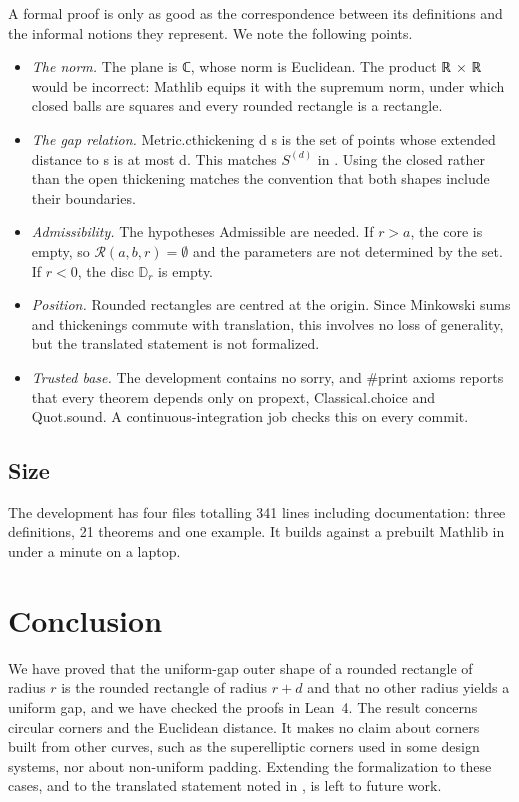 \documentclass[a4paper,UKenglish,cleveref,autoref,thm-restate]{lipics-v2021}
\newcommand{\Disc}{\mathbb{D}}
\newcommand{\RR}{\mathcal{R}}
\newcommand{\lean}[1]{{\leanfont #1}}
\begin{document}
A formal proof is only as good as the correspondence between its definitions and the informal
notions they represent. We note the following points.

\begin{itemize}
  \item \emph{The norm.} The plane is \lean{ℂ}, whose norm is Euclidean. The product
        \lean{ℝ × ℝ} would be incorrect: Mathlib equips it with the supremum norm, under which
        closed balls are squares and every rounded rectangle is a rectangle.
  \item \emph{The gap relation.} \lean{Metric.cthickening d s} is the set of points whose
        extended distance to \lean{s} is at most \lean{d}. This matches $S^{(d)}$ in
        . Using the closed rather than the open thickening matches the convention
        that both shapes include their boundaries.
  \item \emph{Admissibility.} The hypotheses \lean{Admissible} are needed. If $r > a$, the core
        is empty, so $\RR(a, b, r) = \emptyset$ and the parameters are not determined by the
        set. If $r < 0$, the disc $\Disc_r$ is empty.
  \item \emph{Position.} Rounded rectangles are centred at the origin. Since Minkowski sums and
        thickenings commute with translation, this involves no loss of generality, but the
        translated statement is not formalized.
  \item \emph{Trusted base.} The development contains no \lean{sorry}, and
        \lean{\#print axioms} reports that every theorem depends only on \lean{propext},
        \lean{Classical.choice} and \lean{Quot.sound}. A continuous-integration job checks this
        on every commit.
\end{itemize}

\subsection{Size}

The development has four files totalling 341 lines including documentation: three definitions,
21 theorems and one example. It builds against a prebuilt Mathlib in under a minute on a laptop.

\section{Conclusion}\label{sec:conclusion}

We have proved that the uniform-gap outer shape of a rounded rectangle of radius $r$ is the
rounded rectangle of radius $r + d$ and that no other radius yields a uniform gap, and we have
checked the proofs in Lean~4. The result concerns circular corners and the Euclidean distance. It
makes no claim about corners built from other curves, such as the superelliptic corners used in
some design systems, nor about non-uniform padding. Extending the formalization to these cases,
and to the translated statement noted in , is left to future work.


\end{document}
